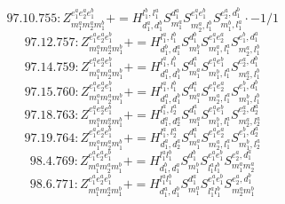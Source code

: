 \documentclass[letterpaper,10pt,fleqn,leqno,onecolumn]{article}
\begin{document}
\begin{equation} \;\;\;\;\;\;  97.10.755: Z^{e_{1}^{a}e_{2}^{a}e_{1}^{b}}_{m_{1}^{a}m_{2}^{a}m_{1}^{b}}+=H^{l_{1}^{b},l_{1}^{a}}_{d_{1}^{a},d_{1}^{b}}S^{d_{1}^{a}}_{m_{1}^{a}}S^{e_{1}^{a}e_{1}^{b}}_{m_{2}^{a},l_{1}^{b}}S^{e_{2}^{a},d_{1}^{b}}_{m_{1}^{b},l_{1}^{a}}\cdot -1/1 \end{equation}
\begin{equation} \;\;\;\;\;\;  97.12.757: Z^{e_{1}^{a}e_{2}^{a}e_{1}^{b}}_{m_{1}^{a}m_{2}^{a}m_{1}^{b}}+=H^{l_{1}^{a},l_{1}^{b}}_{d_{1}^{b},d_{1}^{a}}S^{d_{1}^{b}}_{m_{1}^{b}}S^{e_{1}^{a}e_{2}^{a}}_{m_{1}^{a},l_{1}^{a}}S^{e_{1}^{b},d_{1}^{a}}_{m_{2}^{a},l_{1}^{b}} \end{equation}
\begin{equation} \;\;\;\;\;\;  97.14.759: Z^{e_{1}^{a}e_{2}^{a}e_{1}^{b}}_{m_{1}^{a}m_{2}^{a}m_{1}^{b}}+=H^{l_{1}^{a},l_{1}^{b}}_{d_{1}^{a},d_{1}^{b}}S^{d_{1}^{a}}_{m_{1}^{a}}S^{e_{1}^{a}e_{1}^{b}}_{m_{1}^{b},l_{1}^{a}}S^{e_{2}^{a},d_{1}^{b}}_{m_{2}^{a},l_{1}^{b}} \end{equation}
\begin{equation} \;\;\;\;\;\;  97.15.760: Z^{e_{1}^{a}e_{2}^{a}e_{1}^{b}}_{m_{1}^{a}m_{2}^{a}m_{1}^{b}}+=H^{l_{1}^{a},l_{1}^{b}}_{d_{1}^{a},d_{1}^{b}}S^{d_{1}^{a}}_{m_{1}^{a}}S^{e_{1}^{a}e_{2}^{a}}_{m_{2}^{a},l_{1}^{a}}S^{e_{1}^{b},d_{1}^{b}}_{m_{1}^{b},l_{1}^{b}} \end{equation}
\begin{equation} \;\;\;\;\;\;  97.18.763: Z^{e_{1}^{a}e_{2}^{a}e_{1}^{b}}_{m_{1}^{a}m_{2}^{a}m_{1}^{b}}+=H^{l_{1}^{a},l_{2}^{a}}_{d_{1}^{a},d_{2}^{a}}S^{d_{1}^{a}}_{m_{1}^{a}}S^{e_{1}^{a}e_{1}^{b}}_{m_{1}^{b},l_{1}^{a}}S^{e_{2}^{a},d_{2}^{a}}_{m_{2}^{a},l_{2}^{a}} \end{equation}
\begin{equation} \;\;\;\;\;\;  97.19.764: Z^{e_{1}^{a}e_{2}^{a}e_{1}^{b}}_{m_{1}^{a}m_{2}^{a}m_{1}^{b}}+=H^{l_{1}^{a},l_{2}^{a}}_{d_{1}^{a},d_{2}^{a}}S^{d_{1}^{a}}_{m_{1}^{a}}S^{e_{1}^{a}e_{2}^{a}}_{m_{2}^{a},l_{1}^{a}}S^{e_{1}^{b},d_{2}^{a}}_{m_{1}^{b},l_{2}^{a}} \end{equation}
\begin{equation} \;\;\;\;\;\;  98.4.769: Z^{e_{1}^{a}e_{2}^{a}e_{1}^{b}}_{m_{1}^{a}m_{2}^{a}m_{1}^{b}}+=H^{l_{1}^{a}l_{1}^{b}}_{d_{1}^{b},d_{1}^{a}}S^{d_{1}^{b}}_{m_{1}^{b}}S^{e_{1}^{a}e_{1}^{b}}_{l_{1}^{a}l_{1}^{b}}S^{e_{2}^{a},d_{1}^{a}}_{m_{1}^{a}m_{2}^{a}} \end{equation}
\begin{equation} \;\;\;\;\;\;  98.6.771: Z^{e_{1}^{a}e_{2}^{a}e_{1}^{b}}_{m_{1}^{a}m_{2}^{a}m_{1}^{b}}+=H^{l_{1}^{a}l_{1}^{b}}_{d_{1}^{a},d_{1}^{b}}S^{d_{1}^{a}}_{m_{1}^{a}}S^{e_{1}^{a}e_{1}^{b}}_{l_{1}^{a}l_{1}^{b}}S^{e_{2}^{a},d_{1}^{b}}_{m_{2}^{a}m_{1}^{b}} \end{equation}
\end{document}
